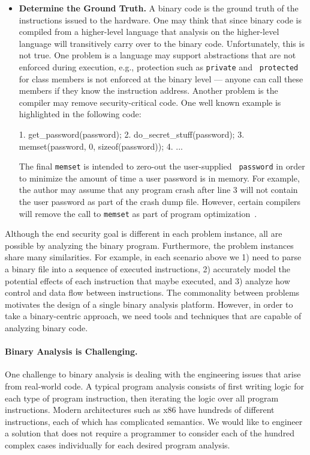 \begin{itemize}
\item {\bf Determine the Ground Truth.}  A binary code is the ground
  truth of the instructions issued to the hardware.  One may think
  that since binary code is compiled from a higher-level language that
  analysis on the higher-level language will transitively carry over
  to the binary code. Unfortunately, this is not true.  One problem is
  a language may support abstractions that are not enforced during
  execution, e.g., protection such as {\tt private} and {\tt
    protected} for class members is not enforced at the binary level
  --- anyone can call these members if they know the instruction
  address. Another problem is the compiler may remove
  security-critical code. One well known example is highlighted in the
  following code:
  \begin{small}
  \begin{code}
1. get\_password(password);
2. do\_secret\_stuff(password);
3. memset(password, 0, sizeof(password)); 
4. ...
  \end{code}
  \end{small}
  The final {\tt memset} is intended to zero-out the user-supplied {\tt
    password} in order to minimize the amount of time a user password
  is in memory.  For example, the author may assume that any program
  crash after line 3 will not contain the user password as part of the
  crash dump file. However, certain compilers will remove the call to
  {\tt memset} as part of program optimization~\cite{howard:2002}.
\end{itemize}


Although the end security goal is different in each problem instance,
all are possible by analyzing the binary program.  Furthermore, the
problem instances share many similarities. For example, in each
scenario above we 1) need to parse a binary file into a sequence of
executed instructions, 2) accurately model the potential effects of
each instruction that maybe executed, and 3) analyze how control and
data flow between instructions.  The commonality between problems
motivates the design of a single binary analysis platform.
However, in order to take a binary-centric approach, we need tools and
techniques that are capable of analyzing binary code.

\paragraph{Binary Analysis is Challenging.} One challenge to binary
analysis is dealing with the engineering issues that arise from
real-world code.  A typical program analysis consists of first writing
logic for each type of program instruction, then iterating the logic
over all program instructions. Modern architectures such as x86 have
hundreds of different instructions, each of which has complicated
semantics.  We would like to engineer a solution that does not require
a programmer to consider each of the hundred complex cases
individually for each desired program analysis.


